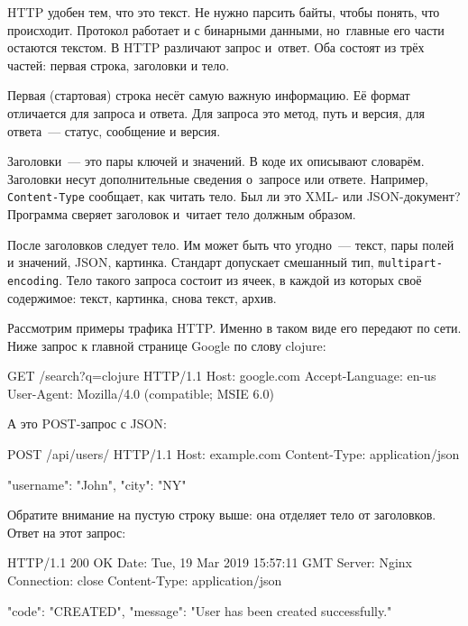 HTTP удобен тем, что это текст. Не нужно парсить байты, чтобы понять, что
происходит. Протокол работает и с бинарными данными, но~главные его части
остаются текстом. В HTTP различают запрос и~ответ. Оба состоят из трёх частей:
первая строка, заголовки и тело.

Первая (стартовая) строка несёт самую важную информацию. Её формат отличается
для запроса и ответа. Для запроса это метод, путь и версия, для ответа~---
статус, сообщение и версия.


Заголовки~--- это пары ключей и значений. В коде их описывают словарём. Заголовки
несут дополнительные сведения о~запросе или ответе. Например,
\verb|Content-Type| сообщает, как читать тело. Был ли это XML- или
JSON-документ? Программа сверяет заголовок и~читает тело должным образом.

После заголовков следует тело. Им может быть что угодно~--- текст, пары полей и
значений, JSON, картинка. Стандарт допускает смешанный тип,
\verb|multipart-encoding|. Тело такого запроса состоит из ячеек, в каждой из
которых своё содержимое: текст, картинка, снова текст, архив.

Рассмотрим примеры трафика HTTP. Именно в таком виде его передают по сети. Ниже
запрос к главной странице Google по слову clojure:

\begin{english}
  \begin{http}
GET /search?q=clojure HTTP/1.1
Host: google.com
Accept-Language: en-us
User-Agent: Mozilla/4.0 (compatible; MSIE 6.0)
  \end{http}
\end{english}

А это POST-запрос с JSON:

\begin{english}
  \begin{http}
POST /api/users/ HTTP/1.1
Host: example.com
Content-Type: application/json

{"username": "John", "city": "NY"}
  \end{http}
\end{english}

Обратите внимание на пустую строку выше: она отделяет тело от заголовков. Ответ
на этот запрос:

\begin{english}
  \begin{http}
HTTP/1.1 200 OK
Date: Tue, 19 Mar 2019 15:57:11 GMT
Server: Nginx
Connection: close
Content-Type: application/json

{
  "code": "CREATED",
  "message": "User has been created successfully."
}
  \end{http}
\end{english}

